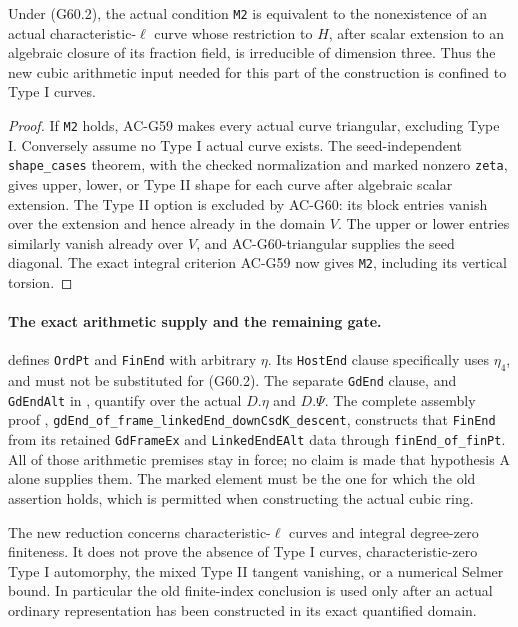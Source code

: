\begin{corollary}
\label{AC-G60-M2}
Under (G60.2), the actual condition \texttt{M2} is
equivalent to the nonexistence of an actual
characteristic-\(\ell\) curve whose restriction to
\(H\), after scalar extension to an algebraic closure
of its fraction field, is irreducible of dimension three.
Thus the new cubic arithmetic input needed for this
part of the construction is confined to Type I curves.
\end{corollary}
\begin{proof}
If \texttt{M2} holds, AC-G59 makes every actual curve
triangular, excluding Type I.
Conversely assume no Type I actual curve exists.
The seed-independent \texttt{shape\_cases} theorem,
with the checked normalization and marked nonzero
\texttt{zeta}, gives upper, lower, or Type II shape
for each curve after algebraic scalar extension.
The Type II option is excluded by AC-G60: its block
entries vanish over the extension and hence already
in the domain \(V\).
The upper or lower entries similarly vanish already
over \(V\), and AC-G60-triangular supplies the seed
diagonal.  The exact integral criterion AC-G59 now
gives \texttt{M2}, including its vertical torsion.
\end{proof}

\paragraph{The exact arithmetic supply and the remaining gate.}
defines \texttt{OrdPt} and \texttt{FinEnd} with arbitrary
\(\eta\).  Its \texttt{HostEnd} clause specifically uses
\(\eta_4\), and must not be substituted for (G60.2).
The separate \texttt{GdEnd} clause, and
\texttt{GdEndAlt} in
,
quantify over the actual \(D.\eta\) and \(D.\Psi\).
The complete assembly proof
,
\texttt{gdEnd\_of\_frame\_linkedEnd\_downCsdK\_descent},
constructs that \texttt{FinEnd} from its retained
\texttt{GdFrameEx} and \texttt{LinkedEndEAlt} data through
\texttt{finEnd\_of\_finPt}.
All of those arithmetic premises stay in force;
no claim is made that hypothesis A alone supplies them.
The marked element must be the one for which the old
assertion holds, which is permitted when constructing
the actual cubic ring.

The new reduction concerns characteristic-\(\ell\)
curves and integral degree-zero finiteness.
It does not prove the absence of Type I curves,
characteristic-zero Type I automorphy, the mixed
Type II tangent vanishing, or a numerical Selmer bound.
In particular the old finite-index conclusion is
used only after an actual ordinary representation
has been constructed in its exact quantified domain.

